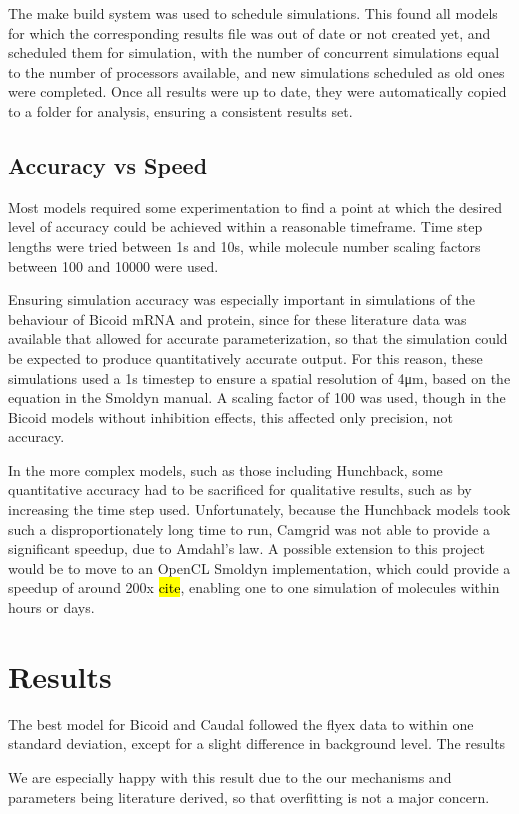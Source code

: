 \documentclass[11pt,a4paper,twocolumn]{article}
\begin{document}
The make build system was used to schedule simulations. This found all models for which the corresponding results file was out of date or not created yet, and scheduled them for simulation, with the number of concurrent simulations equal to the number of processors available, and new simulations scheduled as old ones were completed. Once all results were up to date, they were automatically copied to a folder for analysis, ensuring a consistent results set.

\subsection{Accuracy vs Speed}
Most models required some experimentation to find a point at which the desired level of accuracy could be achieved within a reasonable timeframe. Time step lengths were tried between 1s and 10s, while molecule number scaling factors between 100 and 10000 were used. 

Ensuring simulation accuracy was especially important in simulations of the behaviour of Bicoid mRNA and protein, since for these literature data was available that allowed for accurate parameterization, so that the simulation could be expected to produce quantitatively accurate output. For this reason, these simulations used a 1s timestep to ensure a spatial resolution of 4μm, based on the equation in the Smoldyn manual. A scaling factor of 100 was used, though in the Bicoid models without inhibition effects, this affected only precision, not accuracy.

In the more complex models, such as those including Hunchback, some quantitative accuracy had to be sacrificed for qualitative results, such as by increasing the time step used. Unfortunately, because the Hunchback models took such a disproportionately long time to run, Camgrid was not able to provide a significant speedup, due to Amdahl’s law. A possible extension to this project would be to move to an OpenCL Smoldyn implementation, which could provide a speedup of around 200x \hl{cite}, enabling one to one simulation of molecules within hours or days.

\section{Results}
The best model for Bicoid and Caudal followed the flyex data to within one standard deviation, except for a slight difference in background level. The results 

We are especially happy with this result due to the our mechanisms and parameters being literature derived, so that overfitting is not a major concern.

\nocite{*}


\end{document}
